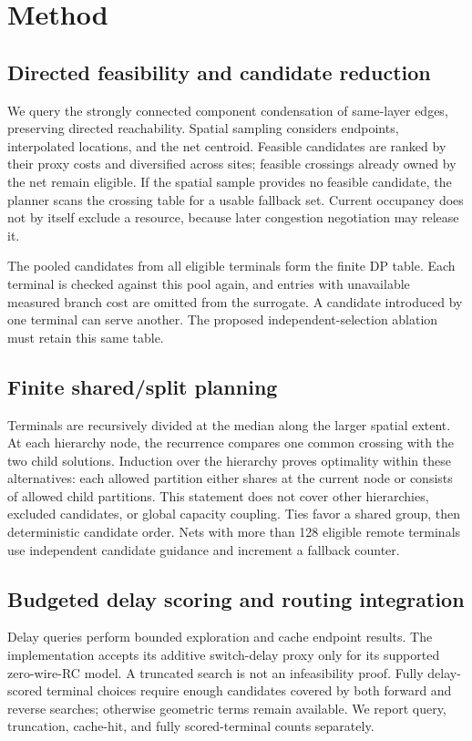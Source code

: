 \documentclass[conference,10pt]{IEEEtran}
\begin{document}
\section{Method}
\subsection{Directed feasibility and candidate reduction}
We query the strongly connected component condensation of same-layer edges, preserving directed reachability. Spatial sampling considers endpoints, interpolated locations, and the net centroid. Feasible candidates are ranked by their proxy costs and diversified across sites; feasible crossings already owned by the net remain eligible. If the spatial sample provides no feasible candidate, the planner scans the crossing table for a usable fallback set. Current occupancy does not by itself exclude a resource, because later congestion negotiation may release it.

The pooled candidates from all eligible terminals form the finite DP table. Each terminal is checked against this pool again, and entries with unavailable measured branch cost are omitted from the surrogate. A candidate introduced by one terminal can serve another. The proposed independent-selection ablation must retain this same table.

\subsection{Finite shared/split planning}
Terminals are recursively divided at the median along the larger spatial extent. At each hierarchy node, the recurrence compares one common crossing with the two child solutions. Induction over the hierarchy proves optimality within these alternatives: each allowed partition either shares at the current node or consists of allowed child partitions. This statement does not cover other hierarchies, excluded candidates, or global capacity coupling. Ties favor a shared group, then deterministic candidate order. Nets with more than 128 eligible remote terminals use independent candidate guidance and increment a fallback counter.

\subsection{Budgeted delay scoring and routing integration}
Delay queries perform bounded exploration and cache endpoint results. The implementation accepts its additive switch-delay proxy only for its supported zero-wire-RC model. A truncated search is not an infeasibility proof. Fully delay-scored terminal choices require enough candidates covered by both forward and reverse searches; otherwise geometric terms remain available. We report query, truncation, cache-hit, and fully scored-terminal counts separately.
\end{document}
